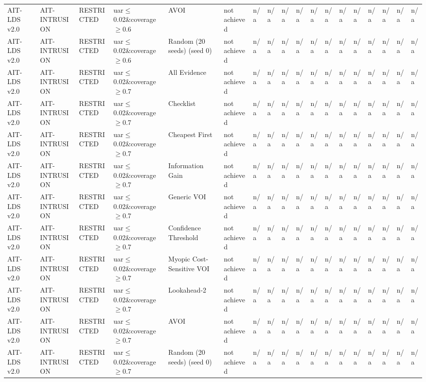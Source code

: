 \begin{table}[!ht]
{\begin{tabular}{llllllllllllllllll}
AIT-LDS v2.0 & AIT-INTRUSION & RESTRICTED & uar$\le$0.02\&coverage$\ge$0.6 & AVOI & not achieved & n/a & n/a & n/a & n/a & n/a & n/a & n/a & n/a & n/a & n/a & n/a & n/a \\
AIT-LDS v2.0 & AIT-INTRUSION & RESTRICTED & uar$\le$0.02\&coverage$\ge$0.6 & Random (20 seeds) (seed 0) & not achieved & n/a & n/a & n/a & n/a & n/a & n/a & n/a & n/a & n/a & n/a & n/a & n/a \\
AIT-LDS v2.0 & AIT-INTRUSION & RESTRICTED & uar$\le$0.02\&coverage$\ge$0.7 & All Evidence & not achieved & n/a & n/a & n/a & n/a & n/a & n/a & n/a & n/a & n/a & n/a & n/a & n/a \\
AIT-LDS v2.0 & AIT-INTRUSION & RESTRICTED & uar$\le$0.02\&coverage$\ge$0.7 & Checklist & not achieved & n/a & n/a & n/a & n/a & n/a & n/a & n/a & n/a & n/a & n/a & n/a & n/a \\
AIT-LDS v2.0 & AIT-INTRUSION & RESTRICTED & uar$\le$0.02\&coverage$\ge$0.7 & Cheapest First & not achieved & n/a & n/a & n/a & n/a & n/a & n/a & n/a & n/a & n/a & n/a & n/a & n/a \\
AIT-LDS v2.0 & AIT-INTRUSION & RESTRICTED & uar$\le$0.02\&coverage$\ge$0.7 & Information Gain & not achieved & n/a & n/a & n/a & n/a & n/a & n/a & n/a & n/a & n/a & n/a & n/a & n/a \\
AIT-LDS v2.0 & AIT-INTRUSION & RESTRICTED & uar$\le$0.02\&coverage$\ge$0.7 & Generic VOI & not achieved & n/a & n/a & n/a & n/a & n/a & n/a & n/a & n/a & n/a & n/a & n/a & n/a \\
AIT-LDS v2.0 & AIT-INTRUSION & RESTRICTED & uar$\le$0.02\&coverage$\ge$0.7 & Confidence Threshold & not achieved & n/a & n/a & n/a & n/a & n/a & n/a & n/a & n/a & n/a & n/a & n/a & n/a \\
AIT-LDS v2.0 & AIT-INTRUSION & RESTRICTED & uar$\le$0.02\&coverage$\ge$0.7 & Myopic Cost-Sensitive VOI & not achieved & n/a & n/a & n/a & n/a & n/a & n/a & n/a & n/a & n/a & n/a & n/a & n/a \\
AIT-LDS v2.0 & AIT-INTRUSION & RESTRICTED & uar$\le$0.02\&coverage$\ge$0.7 & Lookahead-2 & not achieved & n/a & n/a & n/a & n/a & n/a & n/a & n/a & n/a & n/a & n/a & n/a & n/a \\
AIT-LDS v2.0 & AIT-INTRUSION & RESTRICTED & uar$\le$0.02\&coverage$\ge$0.7 & AVOI & not achieved & n/a & n/a & n/a & n/a & n/a & n/a & n/a & n/a & n/a & n/a & n/a & n/a \\
AIT-LDS v2.0 & AIT-INTRUSION & RESTRICTED & uar$\le$0.02\&coverage$\ge$0.7 & Random (20 seeds) (seed 0) & not achieved & n/a & n/a & n/a & n/a & n/a & n/a & n/a & n/a & n/a & n/a & n/a & n/a \\

\end{tabular}}
\end{table}
